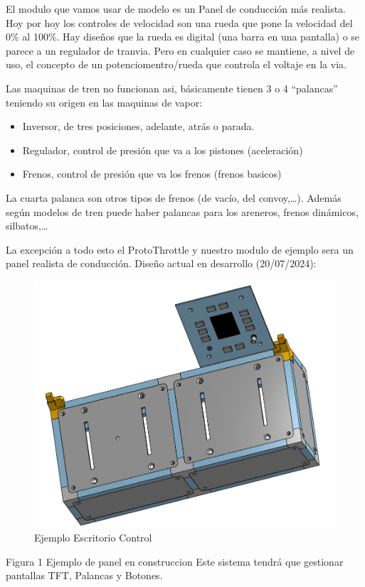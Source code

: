 El modulo que vamos usar de modelo es un Panel de conducción más realista. Hoy por hoy los controles de velocidad
son una rueda que pone la velocidad del 0\% al 100\%. Hay diseños que la rueda es digital (una barra en una
pantalla) o se parece a un regulador de tranvia. Pero en cualquier caso se mantiene, a nivel de uso, el concepto
de un potenciomentro/rueda que controla el voltaje en la via.

Las maquinas de tren no funcionan asi, básicamente tienen 3 o 4 “palancas” teniendo su origen en las maquinas de
vapor:
\begin{itemize}
    \item{} Inversor, de tres posiciones, adelante, atrás o parada.
    \item{} Regulador, control de presión que va a los pistones (aceleración)
    \item{} Frenos, control de presión que va los frenos (frenos basicos)
\end{itemize}
La cuarta palanca son otros tipos de frenos (de vacío, del convoy,…). Además según modelos de tren puede haber palancas para los areneros, frenos dinámicos, silbatos,…

La excepción a todo esto el ProtoThrottle y nuestro modulo de ejemplo sera un panel realista de conducción. Diseño actual en desarrollo (20/07/2024):

\begin{figure}[H]
    \centering{}
    \includegraphics[scale=0.4]{images/EjemploEscritorio.jpeg}
    \caption{Ejemplo Escritorio Control}
    \label{fig:driverDeskExample}
\end{figure}
Figura 1 Ejemplo de panel en construccion
Este sistema tendrá que gestionar pantallas TFT, Palancas y Botones.

